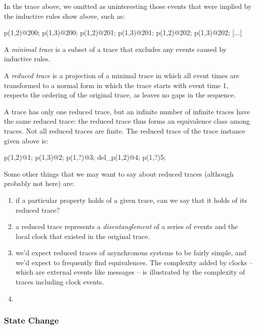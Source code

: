 In the trace above, we omitted as uninteresting those events that were implied by the 
inductive rules show above, such as:

\begin{Dedalus}
p(1,2)@200;
p(1,3)@200;
p(1,2)@201;
p(1,3)@201;
p(1,2)@202;
p(1,3)@202;
[...]
\end{Dedalus}



\begin{definition}
A \emph{minimal trace} is a subset of a trace that excludes any events caused by inductive rules.
\end{definition}

\begin{definition}
A \emph{reduced trace} is a projection of a minimal trace in which all event times are transformed
to a normal form in which the trace starts with event time 1, respects the ordering of the original trace, as leaves no gaps in the sequence.
\end{definition}

A trace has only one reduced trace, but an infinite number of infinite traces have the same reduced trace: the reduced trace thus forms an 
equivalence class among traces.  Not all reduced traces are finite.  The reduced trace of the trace instance given above is:

\begin{Dedalus}
p(1,2)@1;
p(1,3)@2;
p(1,?)@3;
del_p(1,2)@4;
p(1,?)5;
\end{Dedalus}

Some other things that we may want to say about reduced traces (although probably not here) are:
\begin{enumerate}
\item if a particular property holds of a given trace, can we say that it holds of its reduced trace?
\item a reduced trace represents a \emph{disentanglement} of a series of events and the local clock that existed in the original trace.
\item we'd expect reduced traces of asynchronous systems to be fairly simple, and we'd expect to frequently find equivalences.
The complexity added by clocks -- which are external events like messages -- is illustrated by the complexity of traces including
clock events. 
\item 

\end{enumerate}


\subsubsection{State Change}

